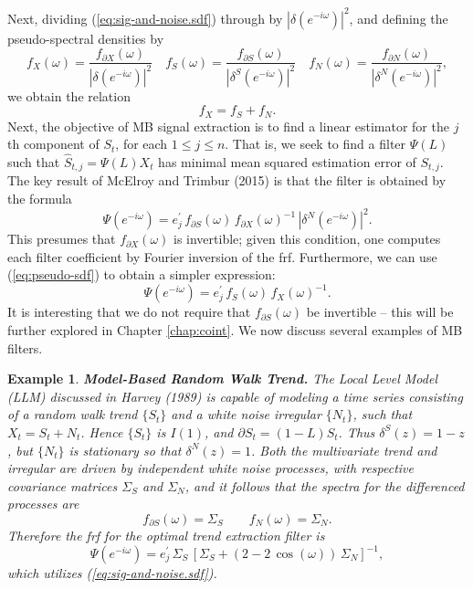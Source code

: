 \documentclass[a4paper]{book}
\newtheorem{Example}{Example}
\begin{document}
   Next, dividing (\ref{eq:sig-and-noise.sdf}) through by ${| \delta (e^{-i\omega}) |}^2$,
  and defining the pseudo-spectral densities by
\begin{equation}
\label{eq:pseudo-sdf}
  f_X (\omega) = \frac{ f_{\partial X} (\omega)}{ {| \delta (e^{-i\omega}) |}^2 }
  \quad   f_S (\omega) = \frac{ f_{\partial S} (\omega)}{ {| \delta^S (e^{-i\omega}) |}^2 }
  \quad   f_N (\omega) = \frac{ f_{\partial N} (\omega)}{ {| \delta^N (e^{-i\omega}) |}^2 },
\end{equation}
  we obtain the relation
\[
  f_X = f_S + f_N.
\]
 Next, the objective of MB signal extraction is to find a linear estimator 
 for the $j$th component  of $S_t$, for each $1 \leq j \leq n$.  That is,
 we seek to find a filter $\Psi (L)$ such that
  $\widehat{S}_{t,j} = \Psi (L) X_t$ has minimal mean squared estimation error of
   $S_{t,j}$.  The key result of McElroy and Trimbur (2015) is that the filter is
   obtained by the formula
  \[
    \Psi (e^{-i \omega}) =  e_j^{\prime} \, f_{\partial S} (\omega) \, 
    { f_{\partial X} (\omega) }^{-1} \, {| \delta^N (e^{-i \omega}) |}^2.
  \]
  This presumes that $f_{\partial X} (\omega) $ is invertible; given this condition,
  one computes each filter coefficient by Fourier inversion of the frf.  
  Furthermore, we can use (\ref{eq:pseudo-sdf})   to obtain a simpler expression:
\[
   \Psi (e^{-i \omega}) =  e_j^{\prime} \, f_{ S} (\omega) \, 
    { f_{ X} (\omega) }^{-1}.
  \]
  It is interesting that we do not require that $f_{\partial S} (\omega)$ be 
  invertible -- this will be further explored in Chapter \ref{chap:coint}.
  We now discuss several examples of MB filters.

\begin{Example} {\bf Model-Based Random Walk Trend.} \rm
\label{exam:trend-i1}
  The Local Level Model (LLM) discussed in Harvey (1989) is capable
  of modeling a time series consisting
 of a  random walk trend $\{ S_t \}$ and a     white noise irregular
 $\{ N_t \}$, such  that $X_t = S_t + N_t$. 
  Hence $\{ S_t \}$ is $I(1)$, and $\partial S_t = (1-L) S_t$.
  Thus $\delta^S (z) = 1- z$, but $\{ N_t \}$ is stationary so that
  $\delta^N (z) = 1$.  
 Both the multivariate trend and  irregular are driven by independent 
 white noise processes, with respective covariance matrices
   $\Sigma_{S}$ and $\Sigma_{N}$,
  and it follows that the spectra for the differenced processes 
   are
  \[
    f_{\partial S} (\omega) = \Sigma_S \qquad f_{N} (\omega) = \Sigma_N.
\]
  Therefore  the frf for the optimal trend extraction filter is
\[ 
 \Psi (e^{-i \omega}) = e_j^{\prime} \, \Sigma_{S} \, 
 { \left[ \Sigma_{S} + (2 - 2 \, \cos (\omega)) \, \Sigma_{N} \right] }^{-1},
\]
 which utilizes (\ref{eq:sig-and-noise.sdf}).
 \end{Example}
\end{document}

